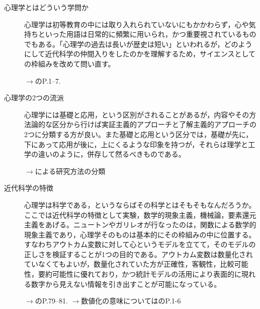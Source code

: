 \begin{description}

	\item[心理学とはどういう学問か] 心理学は初等教育の中には取り入れられていないにもかかわらず，心や気持ちといった用語は日常的に頻繁に用いられ，かつ重要視されているものでもある。「心理学の過去は長いが歴史は短い」といわれるが，どのようにして近代科学の仲間入りをしたのかを理解するため，サイエンスとしての枠組みを改めて問い直す。
	      \begin{flushright}
		      $\to$\textcite{Miura201705}のP.1--7.
	      \end{flushright}

	\item[心理学の2つの流派] 心理学には基礎と応用，という区別がされることがあるが，内容やその方法論的な区分から行けば実証主義的アプローチと了解主義的アプローチの2つに分類する方が良い。また基礎と応用という区分では，基礎が先に，下にあって応用が後に，上にくるような印象を持つが，それらは理学と工学の違いのように，併存して然るべきものである。
	      \begin{flushright}
		      $\to$\textcite{Shimoyama2001}による研究方法の分類
	      \end{flushright}

	\item[近代科学の特徴] 心理学は科学である，というならばその科学とはそもそもなんだろうか。ここでは近代科学の特徴として実験，数学的現象主義，機械論，要素還元主義をあげる。ニュートンやガリレオが行なったのは，関数による数学的現象主義であり，心理学そのものは基本的にその枠組みの中に位置する。すなわちアウトカム変数に対して心というモデルを立てて，そのモデルの正しさを検証することが1つの目的である。アウトカム変数は数量化されていなくてもよいが，数量化されていた方が正確性，客観性，比較可能性，要約可能性に優れており，かつ統計モデルの活用により表面的に現れる数字から見えない情報を引き出すことが可能になっている。
	      \begin{flushright}
		      $\to$\textcite{Miura201705}のP.79--81.
		      $\to$数値化の意味については\textcite{Kawabata201408}のP.1-6
	      \end{flushright}


\end{description}
